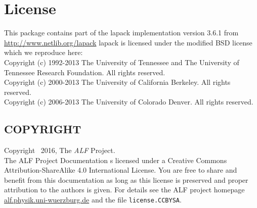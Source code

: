 
\section*{License}


This package contains part of the lapack implementation version 3.6.1 from \url{http://www.netlib.org/lapack}
lapack is licensed under the modified BSD license which we reproduce here:\\

Copyright (c) 1992-2013 The University of Tennessee and The University
                        of Tennessee Research Foundation.  All rights
                        reserved.\\
Copyright (c) 2000-2013 The University of California Berkeley. All
                        rights reserved.\\
Copyright (c) 2006-2013 The University of Colorado Denver.  All rights
                        reserved.
                        
\subsection*{COPYRIGHT}

Copyright \textcopyright ~2016, The \textit{ALF} Project.\\
The ALF Project Documentation 
s licensed under a Creative Commons Attribution-ShareAlike 4.0 International License.
You are free to share and benefit from this documentation as long as this license is preserved
and proper attribution to the authors is given. For details see the ALF project
homepage \url{alf.physik.uni-wuerzburg.de} and the file \texttt{license.CCBYSA}.
